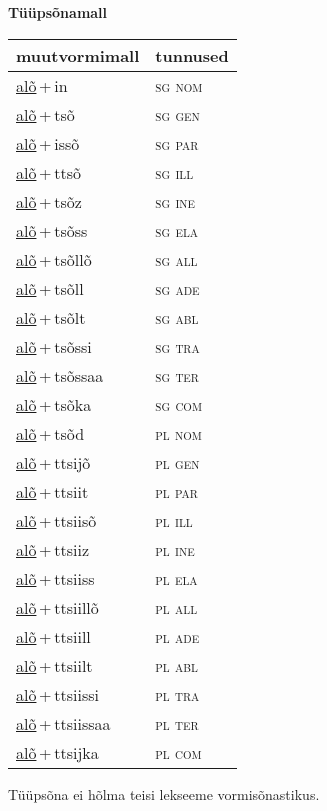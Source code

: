 
\vspace{1.8em}
\begin{minipage}{\textwidth}
\textbf{Tüüpsõnamall \,}\\

\begin{sideways}
\begin{tabular}{l l}
muutvormimall & tunnused \\
\hline
\underline{alõ}\,+\,in & \textsc{ sg nom } \\
\underline{alõ}\,+\,tsõ & \textsc{ sg gen } \\
\underline{alõ}\,+\,issõ & \textsc{ sg par } \\
\underline{alõ}\,+\,ttsõ & \textsc{ sg ill } \\
\underline{alõ}\,+\,tsõz & \textsc{ sg ine } \\
\underline{alõ}\,+\,tsõss & \textsc{ sg ela } \\
\underline{alõ}\,+\,tsõllõ & \textsc{ sg all } \\
\underline{alõ}\,+\,tsõll & \textsc{ sg ade } \\
\underline{alõ}\,+\,tsõlt & \textsc{ sg abl } \\
\underline{alõ}\,+\,tsõssi & \textsc{ sg tra } \\
\underline{alõ}\,+\,tsõssaa & \textsc{ sg ter } \\
\underline{alõ}\,+\,tsõka & \textsc{ sg com } \\
\underline{alõ}\,+\,tsõd & \textsc{ pl nom } \\
\underline{alõ}\,+\,ttsijõ & \textsc{ pl gen } \\
\underline{alõ}\,+\,ttsiit & \textsc{ pl par } \\
\underline{alõ}\,+\,ttsiisõ & \textsc{ pl ill } \\
\underline{alõ}\,+\,ttsiiz & \textsc{ pl ine } \\
\underline{alõ}\,+\,ttsiiss & \textsc{ pl ela } \\
\underline{alõ}\,+\,ttsiillõ & \textsc{ pl all } \\
\underline{alõ}\,+\,ttsiill & \textsc{ pl ade } \\
\underline{alõ}\,+\,ttsiilt & \textsc{ pl abl } \\
\underline{alõ}\,+\,ttsiissi & \textsc{ pl tra } \\
\underline{alõ}\,+\,ttsiissaa & \textsc{ pl ter } \\
\underline{alõ}\,+\,ttsijka & \textsc{ pl com } \\
\end{tabular}
\end{sideways}
\label{tab:tüüpsõnamall-alõin}

\end{minipage}

 
\vspace{1em}
\noindent Tüüpsõna ei hõlma teisi lekseeme vormi\-sõnastikus.
